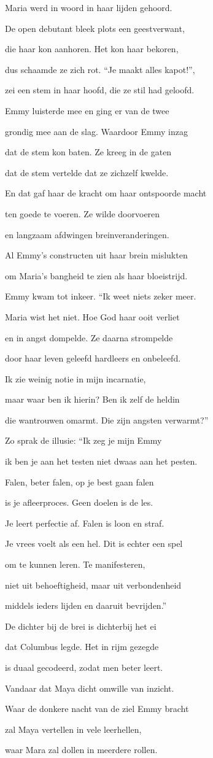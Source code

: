 Maria werd in woord
in haar lijden gehoord.

De open debutant
bleek plots een geestverwant,

die haar kon aanhoren.
Het kon haar bekoren,

dus schaamde ze zich rot.
“Je maakt alles kapot!”,

zei een stem in haar hoofd,
die ze stil had geloofd.

Emmy luisterde mee
en ging er van de twee

grondig mee aan de slag.
Waardoor Emmy inzag

dat de stem kon baten.
Ze kreeg in de gaten

dat de stem vertelde
dat ze zichzelf kwelde.

En dat gaf haar de kracht
om haar ontspoorde macht

ten goede te voeren.
Ze wilde doorvoeren

en langzaam afdwingen
breinveranderingen.

Al Emmy’s constructen
uit haar brein mislukten

om Maria’s bangheid
te zien als haar bloeistrijd.

Emmy kwam tot inkeer.
“Ik weet niets zeker meer.

Maria wist het niet.
Hoe God haar ooit verliet

en in angst dompelde.
Ze daarna strompelde

door haar leven geleefd
hardleers en onbeleefd.

Ik zie weinig notie
in mijn incarnatie,

maar waar ben ik hierin?
Ben ik zelf de heldin

die wantrouwen omarmt.
Die zijn angsten verwarmt?”

Zo sprak de illusie:
“Ik zeg je mijn Emmy

ik ben je aan het testen
niet dwaas aan het pesten.

Falen, beter falen,
op je best gaan falen

is je afleerproces.
Geen doelen is de les.

Je leert perfectie af.
Falen is loon en straf.

Je vrees voelt als een hel.
Dit is echter een spel

om te kunnen leren.
Te manifesteren,

niet uit behoeftigheid,
maar uit verbondenheid

middels ieders lijden
en daaruit bevrijden.”

De dichter bij de brei
is dichterbij het ei

dat Columbus legde.
Het in rijm gezegde

is duaal gecodeerd,
zodat men beter leert.

Vandaar dat Maya dicht
omwille van inzicht.

Waar de donkere nacht
van de ziel Emmy bracht

zal Maya vertellen
in vele leerhellen,

waar Mara zal dollen
in meerdere rollen.
